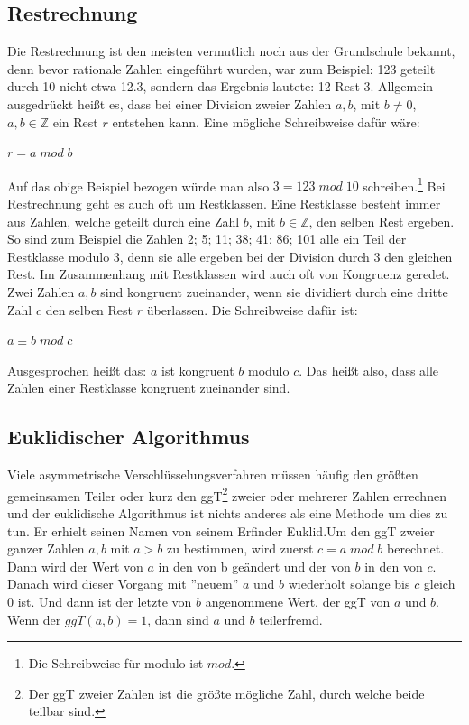 \documentclass[a4paper,12pt,titlepage]{article}
\begin{document}
\subsection{Restrechnung}
Die Restrechnung ist den meisten vermutlich noch aus der Grundschule bekannt, denn bevor rationale Zahlen eingeführt wurden, war zum Beispiel: 123 geteilt durch 10 nicht etwa 12.3, sondern das Ergebnis lautete: 12 Rest 3. Allgemein ausgedrückt heißt es, dass bei einer Division zweier Zahlen $a,b$, mit $b \neq 0$, $a,b \in \mathbb{Z}$ ein Rest $r$ entstehen kann. Eine mögliche Schreibweise dafür wäre:
\begin{center}
$r = a \; mod \; b$
\end{center}
Auf das obige Beispiel bezogen würde man also $3 = 123 \; mod \; 10$ schreiben.\footnote{Die Schreibweise für modulo ist $mod$.} \newline Bei Restrechnung geht es auch oft um Restklassen. Eine Restklasse besteht immer aus Zahlen, welche geteilt durch eine Zahl $b$, mit $b \in \mathbb{Z}$, den selben Rest ergeben. So sind zum Beispiel die Zahlen 2; 5; 11; 38; 41; 86; 101 alle ein Teil der Restklasse modulo 3, denn sie alle ergeben bei der Division durch 3 den gleichen Rest. Im Zusammenhang mit Restklassen wird auch oft von Kongruenz geredet. Zwei Zahlen $a, b$ sind kongruent zueinander, wenn sie dividiert durch eine dritte Zahl $c$ den selben Rest $r$ überlassen. Die Schreibweise dafür ist:
 \begin{center}
$a \equiv b \; mod \; c$
 \end{center}
Ausgesprochen heißt das: $a$ ist kongruent $b$ modulo $c$.
Das heißt also, dass alle Zahlen einer Restklasse kongruent zueinander sind.

\subsection{Euklidischer Algorithmus}
Viele asymmetrische Verschlüsselungsverfahren müssen häufig den größten gemeinsamen Teiler oder kurz den ggT\footnote{Der ggT zweier Zahlen ist die größte mögliche Zahl, durch welche beide teilbar sind.} zweier oder mehrerer Zahlen errechnen und der euklidische Algorithmus ist nichts anderes als eine Methode um dies zu tun. Er erhielt seinen Namen von seinem Erfinder Euklid.\newline Um den ggT zweier ganzer Zahlen $a, b$ mit $a > b$ zu bestimmen, wird zuerst $c = a \; mod \; b$ berechnet. Dann wird der Wert von $a$ in den von b geändert und der von $b$ in den von $c$. Danach wird dieser Vorgang mit ''neuem'' $a$ und $b$ wiederholt solange bis $c$ gleich 0 ist. Und dann ist der letzte von $b$ angenommene Wert, der ggT von $a$ und $b$.
Wenn der $ggT(a, b) = 1$, dann sind $a$ und $b$ teilerfremd.
\end{document}
